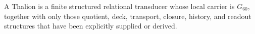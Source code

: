 \setcounter{theorem}{0}
\begin{definition}[Thalion]
A Thalion is a finite structured relational transducer whose local carrier is $G_{60}$, together with only those quotient, deck, transport, closure, history, and readout structures that have been explicitly supplied or derived.
\end{definition}
